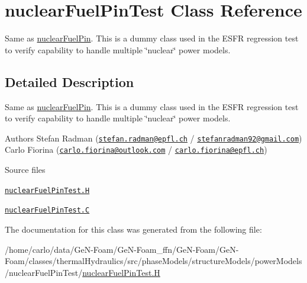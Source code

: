 \hypertarget{classFoam_1_1thermoSubstructures_1_1nuclearFuelPinTest}{}\section{nuclear\+Fuel\+Pin\+Test Class Reference}
\label{classFoam_1_1thermoSubstructures_1_1nuclearFuelPinTest}


Same as \hyperlink{classFoam_1_1thermoSubstructures_1_1nuclearFuelPin}{nuclear\+Fuel\+Pin}. This is a dummy class used in the E\+S\+FR regression test to verify capability to handle multiple \char`\"{}nuclear\char`\"{} power models.  




\subsection{Detailed Description}
Same as \hyperlink{classFoam_1_1thermoSubstructures_1_1nuclearFuelPin}{nuclear\+Fuel\+Pin}. This is a dummy class used in the E\+S\+FR regression test to verify capability to handle multiple \char`\"{}nuclear\char`\"{} power models. 

\label{_Description}%
 Authors Stefan Radman (\href{mailto:stefan.radman@epfl.ch}{\tt stefan.\+radman@epfl.\+ch} / \href{mailto:stefanradman92@gmail.com}{\tt stefanradman92@gmail.\+com}) Carlo Fiorina (\href{mailto:carlo.fiorina@outlook.com}{\tt carlo.\+fiorina@outlook.\+com} / \href{mailto:carlo.fiorina@epfl.ch}{\tt carlo.\+fiorina@epfl.\+ch})

\begin{DoxyParagraph}{Source files}

\begin{DoxyItemize}
\item \href{../../../home/carlo/data/GeN-Foam/GeN-Foam_ffn/GeN-Foam/GeN-Foam/classes/thermalHydraulics/src/phaseModels/structureModels/powerModels/nuclearFuelPinTest/nuclearFuelPinTest.H}{\tt nuclear\+Fuel\+Pin\+Test.\+H} 
\item \href{../../../home/carlo/data/GeN-Foam/GeN-Foam_ffn/GeN-Foam/GeN-Foam/classes/thermalHydraulics/src/phaseModels/structureModels/powerModels/nuclearFuelPinTest/nuclearFuelPinTest.C}{\tt nuclear\+Fuel\+Pin\+Test.\+C} 
\end{DoxyItemize}
\end{DoxyParagraph}


The documentation for this class was generated from the following file\+:\begin{DoxyCompactItemize}
\item 
/home/carlo/data/\+Ge\+N-\/\+Foam/\+Ge\+N-\/\+Foam\+\_\+ffn/\+Ge\+N-\/\+Foam/\+Ge\+N-\/\+Foam/classes/thermal\+Hydraulics/src/phase\+Models/structure\+Models/power\+Models/nuclear\+Fuel\+Pin\+Test/\hyperlink{nuclearFuelPinTest_8H}{nuclear\+Fuel\+Pin\+Test.\+H}\end{DoxyCompactItemize}
